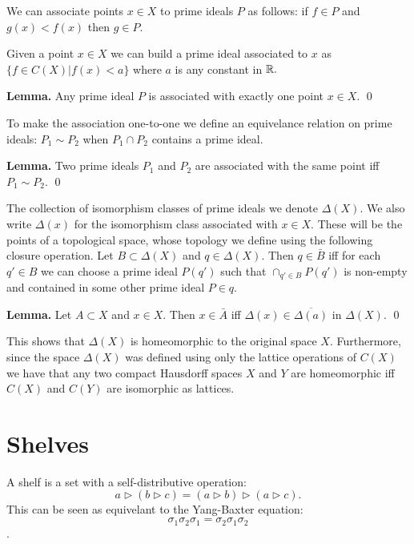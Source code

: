 \documentclass[11pt]{article}
\begin{document}
We can associate points $x\in X$ to prime ideals $P$ as follows:
if $f\in P$ and $g(x)< f(x)$ then $g\in P.$

Given a point $x\in X$ we can build a prime ideal associated to $x$
as $\{f\in C(X) | f(x)<a\}$ where $a$ is any constant in $\mathbb R.$

{\bf Lemma.} Any prime ideal $P$ is associated with exactly one point $x\in X.$
\qed

To make the association one-to-one we
define an equivelance relation on prime ideals:
$P_1\sim P_2$ when $P_1\cap P_2$ contains a prime ideal.

{\bf Lemma.} Two prime ideals $P_1$ and $P_2$ are associated with the same
point iff $P_1\sim P_2.$
\qed

The collection of isomorphism classes of prime ideals we denote $\Delta(X).$
We also write $\Delta(x)$ for the isomorphism class associated with $x\in X.$
These will be the points of a topological space, whose topology we
define using the following closure operation.
Let $B\subset\Delta(X)$ and $q\in\Delta(X).$
Then $q\in\bar{B}$ iff 
for each $q'\in B$
we can choose a prime ideal $P(q')$ such that
$\cap_{q'\in B} P(q')$ is non-empty and contained in some other prime ideal $P\in q.$

{\bf Lemma.} Let $A\subset X$ and $x\in X$. Then $x\in\bar{A}$ iff
$\Delta(x)\in\overline{\Delta(a)}$ in $\Delta(X).$
\qed

This shows that $\Delta(X)$ is homeomorphic to the original space $X.$
Furthermore, since the space $\Delta(X)$
was defined using only the lattice operations of $C(X)$ we have that
any two compact Hausdorff spaces $X$ and $Y$ are homeomorphic iff $C(X)$ and
$C(Y)$ are isomorphic as lattices.


\section{Shelves}

A shelf is a set with a self-distributive operation:
$$
a \triangleright (b \triangleright c) = (a\triangleright b)\triangleright(a\triangleright c).
$$
This can be seen as equivelant to the Yang-Baxter equation:
$$\sigma_1 \sigma_2 \sigma_1 = \sigma_2 \sigma_1 \sigma_2$$
\cite{Crans2004,Dehornoy2012}.
\end{document}
